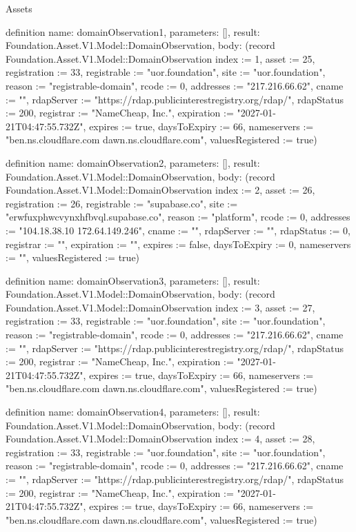 \begin{lexlean}{Assets}
\begin{semanticmodule}
definition{
  name: domainObservation1,
  parameters: [],
  result: Foundation.Asset.V1.Model::DomainObservation,
  body: (record Foundation.Asset.V1.Model::DomainObservation {index := 1, asset := 25, registration := 33, registrable := "uor.foundation", site := "uor.foundation", reason := "registrable-domain", rcode := 0, addresses := "217.216.66.62", cname := "", rdapServer := "https://rdap.publicinterestregistry.org/rdap/", rdapStatus := 200, registrar := "NameCheap, Inc.", expiration := "2027-01-21T04:47:55.732Z", expires := true, daysToExpiry := 66, nameservers := "ben.ns.cloudflare.com dawn.ns.cloudflare.com", valuesRegistered := true})
}

definition{
  name: domainObservation2,
  parameters: [],
  result: Foundation.Asset.V1.Model::DomainObservation,
  body: (record Foundation.Asset.V1.Model::DomainObservation {index := 2, asset := 26, registration := 26, registrable := "supabase.co", site := "erwfuxphwcvynxhfbvql.supabase.co", reason := "platform", rcode := 0, addresses := "104.18.38.10 172.64.149.246", cname := "", rdapServer := "", rdapStatus := 0, registrar := "", expiration := "", expires := false, daysToExpiry := 0, nameservers := "", valuesRegistered := true})
}

definition{
  name: domainObservation3,
  parameters: [],
  result: Foundation.Asset.V1.Model::DomainObservation,
  body: (record Foundation.Asset.V1.Model::DomainObservation {index := 3, asset := 27, registration := 33, registrable := "uor.foundation", site := "uor.foundation", reason := "registrable-domain", rcode := 0, addresses := "217.216.66.62", cname := "", rdapServer := "https://rdap.publicinterestregistry.org/rdap/", rdapStatus := 200, registrar := "NameCheap, Inc.", expiration := "2027-01-21T04:47:55.732Z", expires := true, daysToExpiry := 66, nameservers := "ben.ns.cloudflare.com dawn.ns.cloudflare.com", valuesRegistered := true})
}

definition{
  name: domainObservation4,
  parameters: [],
  result: Foundation.Asset.V1.Model::DomainObservation,
  body: (record Foundation.Asset.V1.Model::DomainObservation {index := 4, asset := 28, registration := 33, registrable := "uor.foundation", site := "uor.foundation", reason := "registrable-domain", rcode := 0, addresses := "217.216.66.62", cname := "", rdapServer := "https://rdap.publicinterestregistry.org/rdap/", rdapStatus := 200, registrar := "NameCheap, Inc.", expiration := "2027-01-21T04:47:55.732Z", expires := true, daysToExpiry := 66, nameservers := "ben.ns.cloudflare.com dawn.ns.cloudflare.com", valuesRegistered := true})
}


\end{semanticmodule}
\end{lexlean}
